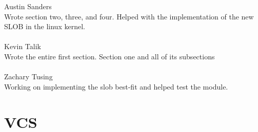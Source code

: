 \documentclass[onecolumn, draftclsnofoot,10pt, compsoc]{IEEEtran}
\begin{document}
        Austin Sanders\\ 
        Wrote section two, three, and four. Helped with the implementation of the new SLOB in the linux kernel.\\
        \\
        Kevin Talik\\
        Wrote the entire first section. Section one and all of its subsections\\
        \\
        Zachary Tusing\\
        Working on implementing the slob best-fit and helped test the module.
        \\
        
        \section{VCS}
        
\end{document}
